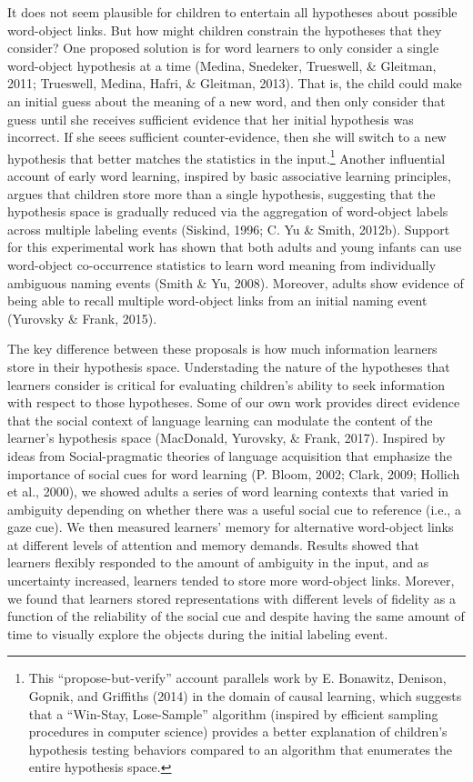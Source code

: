 \documentclass[english,man]{apa6}
\theoremstyle{definition}
\theoremstyle{definition}
\theoremstyle{definition}
\theoremstyle{remark}
\begin{document}
It does not seem plausible for children to entertain all hypotheses
about possible word-object links. But how might children constrain the
hypotheses that they consider? One proposed solution is for word
learners to only consider a single word-object hypothesis at a time
(Medina, Snedeker, Trueswell, \& Gleitman, 2011; Trueswell, Medina,
Hafri, \& Gleitman, 2013). That is, the child could make an initial
guess about the meaning of a new word, and then only consider that guess
until she receives sufficient evidence that her initial hypothesis was
incorrect. If she seees sufficient counter-evidence, then she will
switch to a new hypothesis that better matches the statistics in the
input.\footnote{This \enquote{propose-but-verify} account parallels work
  by E. Bonawitz, Denison, Gopnik, and Griffiths (2014) in the domain of
  causal learning, which suggests that a \enquote{Win-Stay, Lose-Sample}
  algorithm (inspired by efficient sampling procedures in computer
  science) provides a better explanation of children's hypothesis
  testing behaviors compared to an algorithm that enumerates the entire
  hypothesis space.} Another influential account of early word learning,
inspired by basic associative learning principles, argues that children
store more than a single hypothesis, suggesting that the hypothesis
space is gradually reduced via the aggregation of word-object labels
across multiple labeling events (Siskind, 1996; C. Yu \& Smith, 2012b).
Support for this experimental work has shown that both adults and young
infants can use word-object co-occurrence statistics to learn word
meaning from individually ambiguous naming events (Smith \& Yu, 2008).
Moreover, adults show evidence of being able to recall multiple
word-object links from an initial naming event (Yurovsky \& Frank,
2015).

The key difference between these proposals is how much information
learners store in their hypothesis space. Understading the nature of the
hypotheses that learners consider is critical for evaluating children's
ability to seek information with respect to those hypotheses. Some of
our own work provides direct evidence that the social context of
language learning can modulate the content of the learner's hypothesis
space (MacDonald, Yurovsky, \& Frank, 2017). Inspired by ideas from
Social-pragmatic theories of language acquisition that emphasize the
importance of social cues for word learning (P. Bloom, 2002; Clark,
2009; Hollich et al., 2000), we showed adults a series of word learning
contexts that varied in ambiguity depending on whether there was a
useful social cue to reference (i.e., a gaze cue). We then measured
learners' memory for alternative word-object links at different levels
of attention and memory demands. Results showed that learners flexibly
responded to the amount of ambiguity in the input, and as uncertainty
increased, learners tended to store more word-object links. Morever, we
found that learners stored representations with different levels of
fidelity as a function of the reliability of the social cue and despite
having the same amount of time to visually explore the objects during
the initial labeling event.
\end{document}
